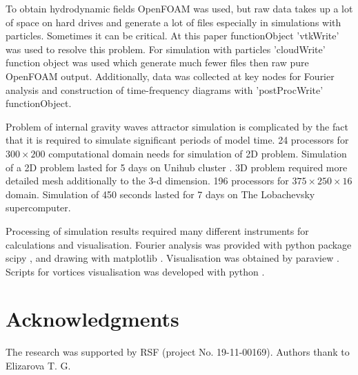 \documentclass[a4wide,fontsize=12pt]{article}
\begin{document}
To obtain hydrodynamic fields OpenFOAM was used, but raw data takes up a lot of space on hard drives and generate a lot of files especially in simulations with particles. Sometimes it can be critical. At this paper functionObject 'vtkWrite' was used to resolve this problem. For simulation with particles 'cloudWrite' function object was used which generate much fewer files then raw pure OpenFOAM output. Additionally, data was collected at key nodes for Fourier analysis and construction of time-frequency diagrams with 'postProcWrite' functionObject.

Problem of internal gravity waves attractor simulation is complicated by the fact that it is required to simulate significant periods of model time. 24 processors for $300 \times 200$ computational domain needs for simulation of 2D problem. Simulation of a 2D problem lasted for 5 days on Unihub cluster \cite{Unihub2014}. 3D problem required more detailed mesh additionally to the 3-d dimension. 196 processors for $375 \times 250 \times 16$ domain. Simulation of 450 seconds lasted for 7 days on The Lobachevsky supercomputer.

Processing of simulation results required many different instruments for calculations and visualisation.
Fourier analysis was provided with python package scipy \cite{scipy}, and drawing with matplotlib \cite{matplotlib}. Visualisation was obtained by paraview \cite{paraview}. Scripts for vortices visualisation was developed with python \cite{python}. 

\section{Acknowledgments}

The research was supported by RSF (project No. 19-11-00169).
Authors thank to Elizarova T. G.



\end{document}
